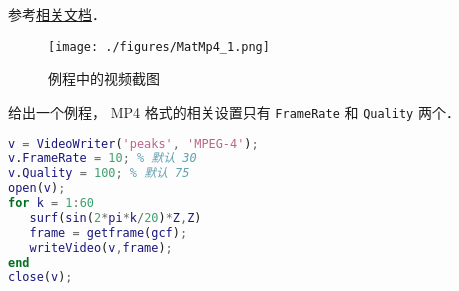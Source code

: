 
\begin{issues}
\issueDraft
\end{issues}


参考\href{https://www.mathworks.com/help/matlab/ref/videowriter.html}{相关文档}．

\begin{figure}[ht]
\centering
\texttt{[image: ./figures/MatMp4\_1.png]}
\caption{例程中的视频截图} \label{MatMp4_fig1}
\end{figure}


给出一个例程， MP4 格式的相关设置只有 \verb|FrameRate| 和 \verb|Quality| 两个．
\begin{lstlisting}[language=matlab, caption=mp4\_demo.m]
% 写 mp4 视频
v = VideoWriter('peaks', 'MPEG-4');
v.FrameRate = 10; % 默认 30
v.Quality = 100; % 默认 75
open(v);
for k = 1:60 
   surf(sin(2*pi*k/20)*Z,Z)
   frame = getframe(gcf);
   writeVideo(v,frame);
end
close(v);
\end{lstlisting}
